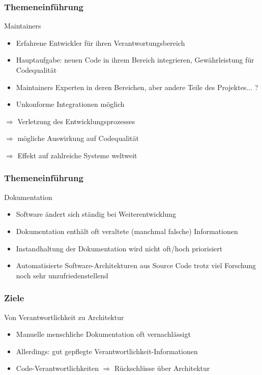 \documentclass{beamer}
\begin{document}
	\begin{frame}
	\frametitle{Themeneinführung}
		\begin{block}{Maintainers}
			\begin{itemize}
				\item Erfahrene Entwickler für ihren Verantwortungsbereich
				\item Hauptaufgabe: neuen Code in ihrem Bereich integrieren, Gewährleistung für Codequalität
				\item Maintainers Experten in deren Bereichen, aber andere Teile des Projektes... ?
				\item Unkonforme Integrationen möglich
			\end{itemize}
		\end{block}

		\centering
		$\Rightarrow$ Verletzung des Entwicklungsprozesses

		$\Rightarrow$ mögliche Auswirkung auf Codequalität

		$\Rightarrow$ Effekt auf zahlreiche Systeme weltweit


	\end{frame}

	\begin{frame}
	\frametitle{Themeneinführung}
		\begin{block}{Dokumentation}
			\begin{itemize}
				\item Software ändert sich ständig bei Weiterentwicklung
				\item Dokumentation enthält oft veraltete (manchmal falsche) Informationen
				\item Instandhaltung der Dokumentation wird nicht oft/hoch priorisiert
				\item Automatisierte Software-Architekturen aus Source Code trotz viel Forschung noch sehr unzufriedenstellend
			\end{itemize}
		\end{block}
	\end{frame}

	\begin{frame}
	\frametitle{Ziele}
		\begin{block}{Von Verantwortlichkeit zu Architektur}
			\begin{itemize}
				\item Manuelle menschliche Dokumentation oft vernachlässigt
				\item Allerdings: gut gepflegte Verantwortlichkeit-Informationen
				\item Code-Verantwortlichkeiten $\Rightarrow$ Rückschlüsse über Architektur
			\end{itemize}
		\end{block}
	\end{frame}
\end{document}
